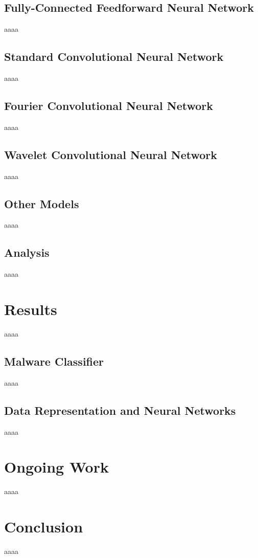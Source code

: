 \documentclass[10pt]{article}
\begin{document}
\subsection{Fully-Connected Feedforward Neural Network}
aaaa

\subsection{Standard Convolutional Neural Network}
aaaa

\subsection{Fourier Convolutional Neural Network}
aaaa

\subsection{Wavelet Convolutional Neural Network} \label{wavelet cnn}
aaaa

\subsection{Other Models} \label{other models}
aaaa

\subsection{Analysis}
aaaa

\section{Results}
aaaa

\subsection{Malware Classifier} \label{malware classifier}
aaaa

\subsection{Data Representation and Neural Networks} \label{data representation}
aaaa

\section{Ongoing Work}
aaaa

\section{Conclusion}
aaaa



\end{document}
